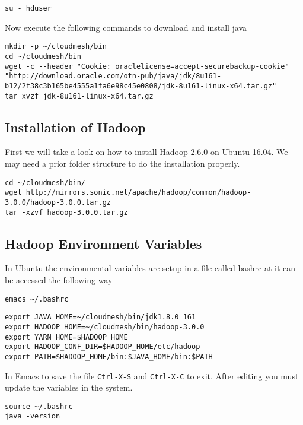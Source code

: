 \begin{lstlisting}
su - hduser
\end{lstlisting}

Now execute the following commands to download and install java

\begin{lstlisting}
mkdir -p ~/cloudmesh/bin
cd ~/cloudmesh/bin
wget -c --header "Cookie: oraclelicense=accept-securebackup-cookie" "http://download.oracle.com/otn-pub/java/jdk/8u161-b12/2f38c3b165be4555a1fa6e98c45e0808/jdk-8u161-linux-x64.tar.gz"
tar xvzf jdk-8u161-linux-x64.tar.gz
\end{lstlisting}

\subsection{Installation of Hadoop}\label{installation-of-hadoop}

First we will take a look on how to install Hadoop 2.6.0 on Ubuntu
16.04. We may need a prior folder structure to do the installation
properly.

\begin{lstlisting}
cd ~/cloudmesh/bin/
wget http://mirrors.sonic.net/apache/hadoop/common/hadoop-3.0.0/hadoop-3.0.0.tar.gz
tar -xzvf hadoop-3.0.0.tar.gz
\end{lstlisting}

\subsection{Hadoop Environment Variables}

In Ubuntu the environmental variables are setup in a file called bashrc
at it can be accessed the following way

\begin{lstlisting}
emacs ~/.bashrc
\end{lstlisting}

\begin{lstlisting}
export JAVA_HOME=~/cloudmesh/bin/jdk1.8.0_161
export HADOOP_HOME=~/cloudmesh/bin/hadoop-3.0.0
export YARN_HOME=$HADOOP_HOME
export HADOOP_CONF_DIR=$HADOOP_HOME/etc/hadoop
export PATH=$HADOOP_HOME/bin:$JAVA_HOME/bin:$PATH
\end{lstlisting}

In Emacs to save the file \verb|Ctrl-X-S| and \verb|Ctrl-X-C| to exit. After editing
you must update the variables in the system.

\begin{lstlisting}
source ~/.bashrc
java -version
\end{lstlisting}

